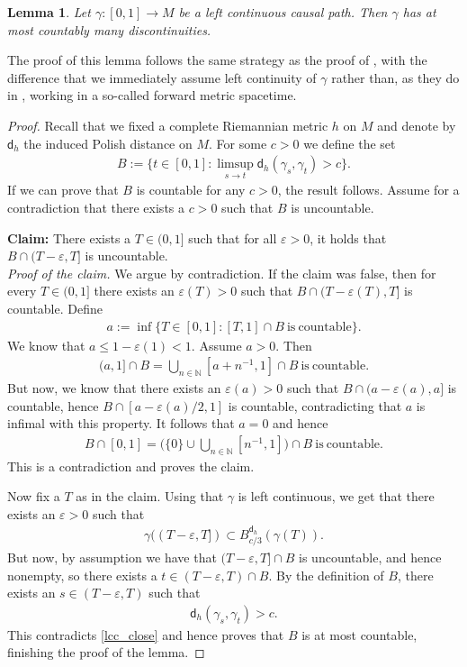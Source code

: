 \documentclass[a4paper,10pt]{article}
\newtheorem{lemma}[theorem]{Lemma}
\numberwithin{equation}{section}
\newcommand{\N}{\mathbb{N}}
\newcommand{\e}{\varepsilon}
\newcommand{\sfd}{\mathsf d}
\begin{document}
\begin{lemma}\label{lcc_cont_ae}
   Let $\gamma\colon  [0,1] \to M$ be a left continuous causal path. Then $\gamma$ has at most countably many discontinuities. 
\end{lemma}
The proof of this lemma follows the same strategy as the proof of \cite[Lemma 2.27]{beran2024nonlinear}, with the difference that we immediately assume left continuity of $\gamma$ rather than, as they do in \cite{beran2024nonlinear}, working in a so-called forward metric spacetime.
\begin{proof}
    Recall that we fixed a complete Riemannian metric $h$ on $M$ and denote by $\sfd_h$ the induced Polish distance on $M$. For some $c>0$ we define the set
    \begin{align*}
        B:= \{t \in [0,1]: \limsup_{s \to t} \sfd_h(\gamma_s, \gamma_t)>c\}.
    \end{align*}
    If we can prove that $B$ is countable for any $c >0$, the result follows. Assume for a  contradiction that there exists a $c>0$ such that $B$ is uncountable. 
    
    \textbf{Claim:} There exists a $T \in (0,1]$ such that for all $\e>0$, it holds that $B\cap (T-\e, T]$ is uncountable. \\
    \textit{Proof of the claim.} We argue by contradiction. If the claim was false, then for every $T \in (0, 1]$ there exists an $\e(T)>0$ such that $B \cap (T-\e(T), T]$ is countable. Define 
    \begin{align*}
        a:= \inf\{T \in [0,1]: [T, 1]\cap B \ \mathrm{is\ countable}\}.
    \end{align*}
    We know that $a \leq 1-\e(1)<1$. Assume $a>0$. Then 
    \begin{align*}
        (a, 1] \cap B = \bigcup_{n \in \N}[a+n^{-1}, 1] \cap B \ \mathrm{is\ countable}.
    \end{align*}
    But now, we know that there exists an $\e(a)>0$ such that $B \cap (a-\e(a), a]$ is countable, hence $B \cap [a-\e(a)/2, 1]$ is countable, contradicting that $a$ is infimal with this property. It follows that $a=0$ and hence 
    \begin{align*}
        B \cap [0,1] = \Big(\{0\} \cup \bigcup_{n \in \N} [n^{-1}, 1]\Big)\cap B \ \mathrm{is\ countable}.
    \end{align*}
    This is a contradiction and proves the claim.

    Now fix a $T$ as in the claim. 
    Using that $\gamma$ is left continuous, we get that there exists an $\e>0$ such that
    \begin{align}\label{lcc_close}
     \gamma((T-\e, T]) \subset B^{\sfd_h}_{c/3}(\gamma(T)).   
    \end{align}
    But now, by assumption we have that $(T-\e, T] \cap B$ is uncountable, and hence nonempty, so there exists a $t \in (T-\e, T) \cap B$. By the definition of $B$, there exists an $s \in (T-\e, T)$ such that 
    \begin{align}
        \sfd_h(\gamma_s, \gamma_t) >c. 
    \end{align}
    This contradicts \eqref{lcc_close} and hence proves that $B$ is at most countable, finishing the proof of the lemma.  
\end{proof}
\end{document}
